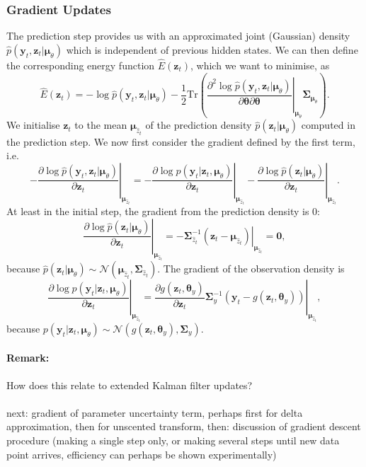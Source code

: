 \documentclass[a4paper,10pt]{article}
\newcommand{\bs}[1]{\mathbf{#1}}					%
\newcommand{\bgs}[1]{\boldsymbol{#1}}				%
\newcommand{\pd}[2]{\frac{\partial #1}{\partial #2}} 	%
\newcommand{\ppd}[3]{\frac{\partial^2 #1}{\partial #2 \partial #3}} %
\newcommand{\eq}[1]{\begin{equation} #1 \end{equation}}%
\newcommand{\trace}[1]{\mathrm{Tr}\left(#1\right)}					%
\renewcommand{\ss}{z}         %
\newcommand{\so}{y}         %
\newcommand{\spm}{\mu}    %
\renewcommand{\sp}{\theta}    %
\newcommand{\ps}{\bs{\ss}}    %
\newcommand{\po}{\bs{\so}}    %
\newcommand{\ppm}{\bgs{\spm}}   %
\newcommand{\pp}{\bgs{\sp}} %
\newcommand{\N}{\mathcal{N}}			%
\newcommand{\Cov}{\bgs{\Sigma}}			%
\begin{document}
\subsubsection{Gradient Updates}
The prediction step provides us with an approximated joint (Gaussian) density $\hat{p}(\po_t,\ps_t|\ppm_\sp)$ which is independent of previous hidden states. We can then define the corresponding energy function $\hat{E}(\ps_t)$, which we want to minimise, as
\eq{
    \hat{E}(\ps_t) = - \log \hat{p}(\po_t,\ps_t|\ppm_\sp) - \frac{1}{2}\trace{\left.\ppd{\log \hat{p}(\po_t,\ps_t|\ppm_\sp)}{\pp}{\pp}\right|_{\ppm_\sp}\Cov_{\ppm_\sp}}.
}
We initialise $\ps_t$ to the mean $\ppm_{\hat{\ss}_t}$ of the prediction density $\hat{p}(\ps_t|\ppm_\sp)$ computed in the prediction step. We now first consider the gradient defined by the first term, i.e.
\eq{
    \left. -\pd{\log \hat{p}(\po_t,\ps_t|\ppm_\sp)}{\ps_t} \right|_{\ppm_{\hat{\ss}_t}} = \left. -\pd{\log p(\po_t|\ps_t,\ppm_\sp)}{\ps_t} \right|_{\ppm_{\hat{\ss}_t}} - \left. \pd{\log \hat{p}(\ps_t|\ppm_\sp)}{\ps_t} \right|_{\ppm_{\hat{\ss}_t}}.
}
At least in the initial step, the gradient from the prediction density is 0:
\eq{
    \left. \pd{\log \hat{p}(\ps_t|\ppm_\sp)}{\ps_t} \right|_{\ppm_{\hat{\ss}_t}} = \left. -\Cov_{\hat{\ss}_t}^{-1} (\ps_t - \ppm_{\hat{\ss}_t}) \right|_{\ppm_{\hat{\ss}_t}} = \bs{0},
}
because $\hat{p}(\ps_t|\ppm_\sp) \sim \N(\ppm_{\hat{\ss}_t}, \Cov_{\hat{\ss}_t})$. The gradient of the observation density is
\eq{
    \left. \pd{\log p(\po_t|\ps_t,\ppm_\sp)}{\ps_t} \right|_{\ppm_{\hat{\ss}_t}} = \left. \pd{g(\ps_t, \pp_\so)}{\ps_t}\Cov_\so^{-1}(\po_t - g(\ps_t, \pp_\so)) \right|_{\ppm_{\hat{\ss}_t}},
}
because $p(\po_t|\ps_t,\ppm_\sp) \sim \N(g(\ps_t, \pp_\so), \Cov_\so)$.

\paragraph{Remark:} How does this relate to extended Kalman filter updates?

\paragraph{} next: gradient of parameter uncertainty term, perhaps first for delta approximation, then for unscented transform, then: discussion of gradient descent procedure (making a single step only, or making several steps until new data point arrives, efficiency can perhaps be shown experimentally)
\end{document}

